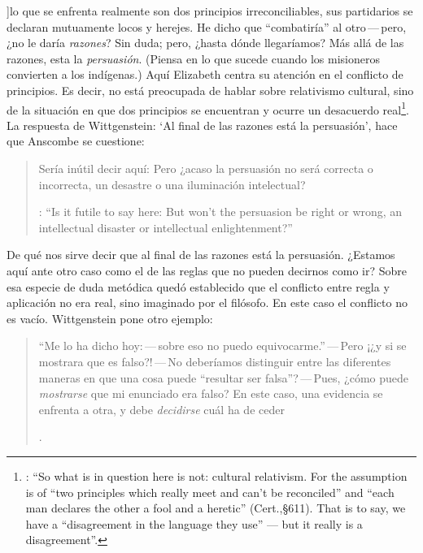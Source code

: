 ]{lo que se enfrenta realmente son dos principios irreconciliables, sus partidarios se declaran mutuamente locos y herejes. He dicho que ``combatiría'' al otro\,---\,pero, ¿no le daría \emph{razones}? Sin duda; pero, ¿hasta dónde llegaríamos? Más allá de las razones, esta la \emph{persuasión}. (Piensa en lo que sucede cuando los misioneros convierten a los indígenas.)} Aquí Elizabeth centra su atención en el conflicto de principios. Es decir, no está preocupada de hablar sobre relativismo cultural, sino de la situación en que dos principios se encuentran y ocurre un desacuerdo real\footnote{\cite[Cf.][131]{anscombe1981parmenides:qli}: \enquote{So what is in question here is not: cultural relativism. For the assumption is of ``two principles which really meet and can't be reconciled'' and ``each man declares the other a fool and a heretic'' (Cert.,\S611). That is to say, we have a ``disagreement in the language they use'' --- but it really is a disagreement}.}. La respuesta de Wittgenstein: \enquote*{Al final de las razones está la persuasión}, hace que Anscombe se cuestione: \blockquote[{\Cite{anscombe1981parmenides:qli}}: \enquote{Is it futile to say here: But won't the persuasion be right or wrong, an intellectual disaster or intellectual enlightenment?}]{Sería inútil decir aquí: Pero ¿acaso la persuasión no será correcta o incorrecta, un desastre o una iluminación intelectual?} De qué nos sirve decir que al final de las razones está la persuasión. ¿Estamos aquí ante otro caso como el de las reglas que no pueden decirnos como ir? Sobre esa especie de duda metódica quedó establecido que el conflicto entre regla y aplicación no era real, sino imaginado por el filósofo. En este caso el conflicto no es vacío. Wittgenstein pone otro ejemplo: \blockquote[{\Cite[\S641]{wittgenstein1969oncertes}}.
]{``Me lo ha dicho hoy:\,---\,sobre eso no puedo equivocarme.''\,---\,Pero ¡¿y si se mostrara que es falso?!\,---\,No deberíamos distinguir entre las diferentes maneras en que una cosa puede ``resultar ser falsa''?\,---\,Pues, ¿cómo puede \emph{mostrarse} que mi enunciado era falso? En este caso, una evidencia se enfrenta a otra, y debe \emph{decidirse} cuál ha de ceder}.

